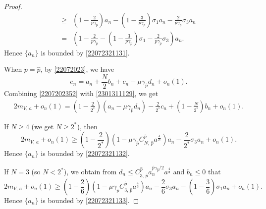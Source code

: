 \documentclass[10pt]{article}
\numberwithin{equation}{section}
\numberwithin{equation}{section}
\begin{document}
\begin{proof}
\[\begin{aligned}
\ge &(1-\frac{2}{p\gamma_p})a_n-(1-\frac{3}{p\gamma_p}) \sigma_1 a_n-\frac{2}{p\gamma_p} {\sigma_3} a_n\\
=&\left(1-\frac{2}{p\gamma_p}-(1-\frac{3}{p\gamma_p}) \sigma_1-\frac{2}{p\gamma_p} {\sigma_3}\right)a_n.
\end{aligned}
\]
Hence $\{a_n\}$ is bounded by \eqref{22072321131}. \par
When $p=\hat{p}$, by \eqref{22072023}, we have
\begin{equation}\label{2301311129}
e_n=a_n+\frac{N}{2}b_n+c_n-\mu\gamma_{\hat{p}} d_n+o_n(1).
\end{equation}
Combining \eqref{2207202352} with \eqref{2301311129}, we get
\[
\begin{aligned}
2{m}_{V,\, a}+o_n(1)= \left(1-\frac2{2^*}\right)\left(a_n-\mu\gamma_{\hat{p}}d_n\right)-\frac2{2^*} c_n+\left(1-\frac{N}{2^*}\right)b_n+o_n(1).
\end{aligned}
\]\par
If $N\ge 4$ (we get $N\ge 2^*$), then
\begin{equation}\label{2301311130}
2{m}_{V,\, a}+o_n(1)\ge  \left(1-\frac2{2^*}\right)\left(1-\mu \gamma_{\hat{p}}C^{\hat{p}}_{N,\, {\hat{p}}}a^{\frac4N}\right)a_n-\frac2{2^*} {\sigma_3} a_n+o_n(1).
\end{equation}
Hence $\{a_n\}$ is bounded by \eqref{22072321132}.\par
If $N=3$ (so $N< 2^*$), we obtain from $d_n\le C^{\hat{p}}_{3,\, {\hat{p}}}a_n^{{\hat{p}}\gamma_{\hat{p}}/2}a^{\frac43}$ and $b_n\le 0$ that
\[
2{m}_{V,\, a}+o_n(1)\ge  \left(1-\frac2{6}\right)\left(1-\mu \gamma_pC^{\hat{p}}_{3,\, {\hat{p}}}a^{\frac43}\right)a_n-\frac2{6} {\sigma_3} a_n-\left(1-\frac{3}{6}\right)\sigma_1a_n+o_n(1).
\]
Hence $\{a_n\}$ is bounded by \eqref{22072321133}.


\end{proof}
\end{document}
